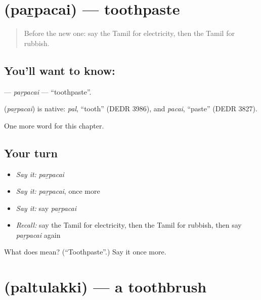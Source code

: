 \section[\texorpdfstring{\ta{பற்பசை} (paṟpacai)}{பற்பசை (paṟpacai)}]{ (paṟpacai) — toothpaste}

\label{lesson:TA-C213-parpacai}



\begin{quote}
Before the new one: say the Tamil for electricity, then the Tamil for rubbish.
\end{quote}

\subsection*{You'll want to know: }
\textbf{} — \emph{paṟpacai} — \textquotedblleft{}toothpaste\textquotedblright{}.

\begin{cousinweb}
\textbf{} (\emph{paṟpacai}) is native: \emph{pal}, \textquotedblleft{}tooth\textquotedblright{} (DEDR 3986), and \emph{pacai}, \textquotedblleft{}paste\textquotedblright{} (DEDR 3827).
\end{cousinweb}

\begin{grammarlens}[title={What you've built}]
One more word for this chapter.
\end{grammarlens}

\subsection*{Your turn}
\begin{itemize}
\raggedright
  \item \emph{Say it:} \emph{paṟpacai}
  \item \emph{Say it:} \emph{paṟpacai}, once more
  \item \emph{Say it:} say \emph{paṟpacai}
  \item \emph{Recall:} say the Tamil for electricity, then the Tamil for rubbish, then say \emph{paṟpacai} again
\end{itemize}

\begin{tcolorbox}[breakable,colback=teal!4,colframe=teal!35!black,title={Before you move on}]
What does  mean? (\textquotedblleft{}Toothpaste\textquotedblright{}.) Say it once more.
\end{tcolorbox}
\section[\texorpdfstring{\ta{பல்துலக்கி} (paltulakki)}{பல்துலக்கி (paltulakki)}]{ (paltulakki) — a toothbrush}

